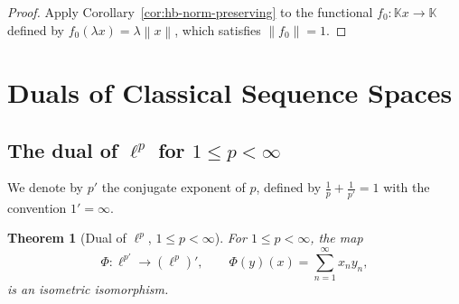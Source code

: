 \documentclass[a4paper,12pt]{book}
\newcommand{\K}{\mathbb{K}}
\newcommand{\norm}[1]{\left\| #1 \right\|}
\theoremstyle{definition}
\theoremstyle{plain}
\newtheorem{theorem}[definition]{Theorem}
\theoremstyle{remark}
\begin{document}
\begin{proof}
Apply Corollary~\ref{cor:hb-norm-preserving} to the functional
$f_0: \K x \to \K$ defined by $f_0(\lambda x) = \lambda\norm{x}$, which
satisfies $\norm{f_0}=1$.
\end{proof}

\section{Duals of Classical Sequence Spaces}\label{sec:dual-classical}

\subsection{The dual of \texorpdfstring{$\ell^p$}{lp} for
\texorpdfstring{$1\le p<\infty$}{1<=p<infty}}

We denote by $p'$ the conjugate exponent of $p$, defined by
$\frac{1}{p}+\frac{1}{p'}=1$ with the convention $1'=\infty$.

\begin{theorem}[{Dual of $\ell^p$, $1\le p<\infty$}]\label{thm:dual-lp}
For $1\le p<\infty$, the map
\[
  \Phi: \ell^{p'} \longrightarrow (\ell^p)',
  \qquad \Phi(y)(x) = \sum_{n=1}^{\infty} x_n y_n,
\]
is an isometric isomorphism.
\end{theorem}
\end{document}
